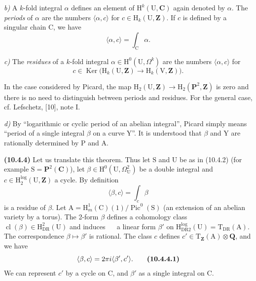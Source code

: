 \documentclass[11pt,leqno]{article}
\newcommand{\Page}[1]{\ifvmode\noindent\else\unskip\ \fi{\footnotesize\textcolor{gray}{[p.\,#1]}}\ \ignorespaces}
\begin{document}
\textit{b)} A \(k\)-fold integral \(\alpha\) defines an element of \(\mathrm{H}^{k}(\mathrm{U},\mathbf{C})\) again denoted by \(\alpha\). The \textit{periods} of \(\alpha\) are the numbers \(\langle\alpha,c\rangle\) for \(c\in\mathrm{H}_{k}(\mathrm{U},\mathbf{Z})\). If \(c\) is defined by a singular chain \(\mathrm{C}\), we have
\[
\langle\alpha,c\rangle=\int_{\mathrm{C}}\alpha.
\]

\textit{c)} The \textit{residues} of a \(k\)-fold integral \(\alpha\in\mathrm{H}^{0}(\mathrm{U},\Omega^{k})\) are the numbers \(\langle\alpha,c\rangle\) for
\[
c\in\operatorname{Ker}\bigl(
\mathrm{H}_{k}(\mathrm{U},\mathbf{Z})
\to\mathrm{H}_{k}(\mathrm{V},\mathbf{Z})\bigr).
\]

In the case considered by Picard, the map \(\mathrm{H}_{2}(\mathrm{U},\mathbf{Z})\to\mathrm{H}_{2}(\mathbf{P}^{2},\mathbf{Z})\) is zero and there is no need to distinguish between periods and residues. For the general case, cf. Lefschetz, [10], note I.

\textit{d)} By “logarithmic or cyclic period of an abelian integral”, Picard simply means “period of a single integral \(\beta\) on a curve \(\mathrm{Y}\)”. It is understood that \(\beta\) and \(\mathrm{Y}\) are rationally determined by \(\mathrm{P}\) and \(\mathrm{A}\).

\textbf{(10.4.4)} Let us translate this theorem. Thus let \(\mathrm{S}\) and \(\mathrm{U}\) be as in (10.4.2) (for example \(\mathrm{S}=\mathbf{P}^{2}(\mathbf{C})\)), let \(\beta\in\mathrm{H}^{0}(\mathrm{U},\Omega^{2}_{\mathrm{U}})\) be a double integral and \(c\in\mathrm{H}^{\log}_{2}(\mathrm{U},\mathbf{Z})\) a cycle. By definition
\[
\langle\beta,c\rangle=\int_c\beta
\]
is a residue of \(\beta\). Let \(\mathrm{A}=\mathrm{H}^{1}_{m}(\mathrm{C})(1)/\operatorname{Pic}^{0}(\mathrm{S})\) (an extension of an abelian variety by a torus). The 2-form \(\beta\) defines a cohomology class \(\operatorname{cl}(\beta)\in\mathrm{H}^{2}_{\mathrm{DR}}(\mathrm{U})\) and induces
\Page{77}
a linear form \(\beta'\) on \(\mathrm{H}^{\log}_{\mathrm{DR}2}(\mathrm{U})=\mathrm{T}_{\mathrm{DR}}(\mathrm{A})\). The correspondence \(\beta\mapsto\beta'\) is rational. The class \(c\) defines \(c'\in\mathrm{T}_{\mathbf{Z}}(\mathrm{A})\otimes\mathbf{Q}\), and we have
\[
\langle\beta,c\rangle=2\pi i\langle\beta',c'\rangle.
\tag*{\textbf{(10.4.4.1)}}
\]
We can represent \(c'\) by a cycle on \(\mathrm{C}\), and \(\beta'\) as a single integral on \(\mathrm{C}\).
\end{document}
